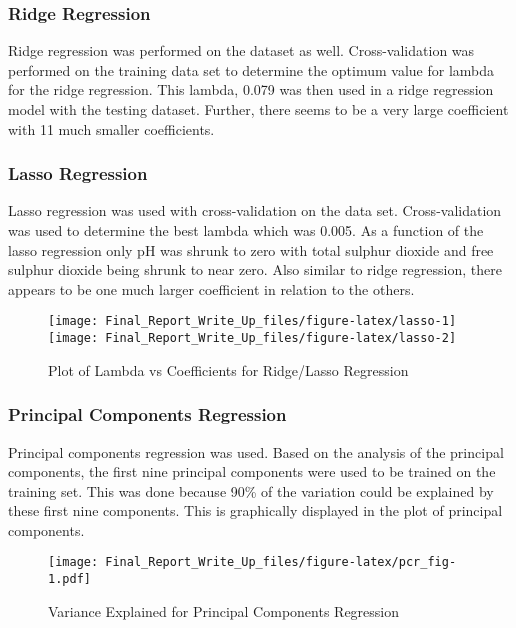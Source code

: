 \documentclass[]{article}
\begin{document}
\subsubsection{Ridge Regression}\label{ridge-regression}

Ridge regression was performed on the dataset as well. Cross-validation
was performed on the training data set to determine the optimum value
for lambda for the ridge regression. This lambda, 0.079 was then used in
a ridge regression model with the testing dataset. Further, there seems
to be a very large coefficient with 11 much smaller coefficients.

\subsubsection{Lasso Regression}\label{lasso-regression}

Lasso regression was used with cross-validation on the data set.
Cross-validation was used to determine the best lambda which was 0.005.
As a function of the lasso regression only pH was shrunk to zero with
total sulphur dioxide and free sulphur dioxide being shrunk to near
zero. Also similar to ridge regression, there appears to be one much
larger coefficient in relation to the others.

\begin{figure}[H]

{\centering \texttt{[image: Final\_Report\_Write\_Up\_files/figure-latex/lasso-1]} \texttt{[image: Final\_Report\_Write\_Up\_files/figure-latex/lasso-2]} 

}

\caption{Plot of Lambda vs Coefficients for Ridge/Lasso Regression}\label{fig:lasso}
\end{figure}

\subsubsection{Principal Components
Regression}\label{principal-components-regression}

Principal components regression was used. Based on the analysis of the
principal components, the first nine principal components were used to
be trained on the training set. This was done because 90\% of the
variation could be explained by these first nine components. This is
graphically displayed in the plot of principal components.

\begin{figure}[htbp]
\centering
\texttt{[image: Final\_Report\_Write\_Up\_files/figure-latex/pcr\_fig-1.pdf]}
\caption{Variance Explained for Principal Components Regression}
\end{figure}
\end{document}
